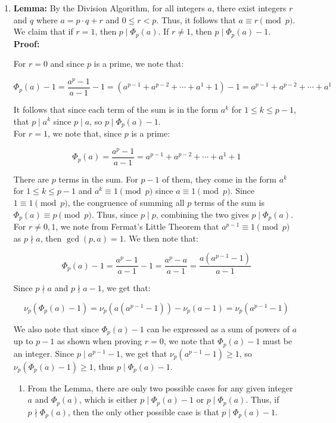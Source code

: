 \documentclass{article}
\begin{document}
\begin{enumerate}
\item  

\textbf{Lemma:} By the Division Algorithm, for all integers $a$, there exist integers $r$ and $q$ where $a = p\cdot q + r$ and $0 \leq r < p$. Thus, it follows that $a \equiv r \pmod{p}$. We claim that if $r = 1$, then $p \mid \Phi_p(a)$. If $r \neq 1$, then $p \mid \Phi_p(a) - 1$. \\

\textbf{Proof:} 

For $r = 0$ and since $p$ is a prime, we note that:

$$\Phi_p(a) - 1  = \frac{a^p-1}{a-1} - 1= (a^{p-1} + a^{p-2} + \cdots + a^{1} + 1) - 1 = a^{p-1} + a^{p-2} + \cdots + a^{1}$$

It follows that since each term of the sum is in the form $a^k$ for $1 \leq k \leq p - 1$, that $p\mid a^k$ since $p \mid a$, so $p \mid \Phi_p(a) - 1$.\\

For $r = 1$, we note that, since $p$ is a prime: 

$$\Phi_p(a) = \frac{a^p-1}{a-1} = a^{p-1} + a^{p-2} + \cdots + a^{1} + 1$$

There are $p$ terms in the sum. For $p - 1$ of them, they come in the form $a^k$ for $1 \leq k \leq p - 1$ and $a^k \equiv 1 \pmod{p}$ since $a \equiv 1 \pmod{p}$. Since $1 \equiv 1 \pmod{p}$, the congruence of summing all $p$ terms of the sum is $\Phi_p(a) \equiv p \pmod{p}$. Thus, since $p \mid p$, combining the two gives $p \mid \Phi_p(a)$. \\

For $r \neq  0, 1$, we note from Fermat's Little Theorem that $a^{p-1} \equiv 1 \pmod{p}$ as $p \nmid a$, then $\gcd(p, a) = 1$. We then note that:

$$\Phi_p(a) - 1 = \frac{a^p -1 }{a -1} - 1 = \frac{a^p -a}{a -1} = \frac{a(a^{p - 1} - 1)}{a-1}$$

Since $p \nmid a$ and $p \nmid a - 1$, we get that: 

$$\nu_p(\Phi_p(a) - 1) = \nu_p(a(a^{p-1} - 1)) - \nu_p(a-1) = \nu_p(a^{p-1} - 1) $$

We also note that since $\Phi_p(a) - 1$ can be expressed as a sum of powers of $a$ up to $p-1$ as shown when proving $r = 0$, we note that $\Phi_p(a) - 1$ must be an integer. Since $p \mid a^{p - 1} - 1$, we get that $\nu_p(a^{p-1} - 1) \geq 1$, so $\nu_p(\Phi_p(a) - 1) \geq 1$, thus $p \mid \Phi_p(a) - 1$. \\
\begin{enumerate}
    \item 
    From the Lemma, there are only two possible cases for any given integer $a$ and $\Phi_p(a)$, which is either $ p \mid \Phi_p(a) - 1$ or $ p \mid \Phi_p(a) $. Thus, if $ p \nmid \Phi_p(a) $, then the only other possible case is that $ p \mid \Phi_p(a) - 1$. \\


\end{enumerate}
\end{enumerate}
\end{document}
